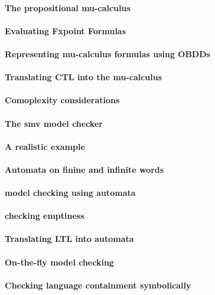 \paragraph{The propositional mu-calculus}
\paragraph{Evaluating Fxpoint Formulas}
\paragraph{Representing mu-calculus formulas using OBDDs}
\paragraph{Translating CTL into the mu-calculus}
\paragraph{Comoplexity considerations}
\paragraph{The smv model checker}
\paragraph{A realistic example}
\paragraph{Automata on finine and infinite words}
\paragraph{model checking using automata}
\paragraph{checking emptiness}
\paragraph{Translating LTL into automata}
\paragraph{On-the-fly model checking}
\paragraph{Checking language containment symbolically}
